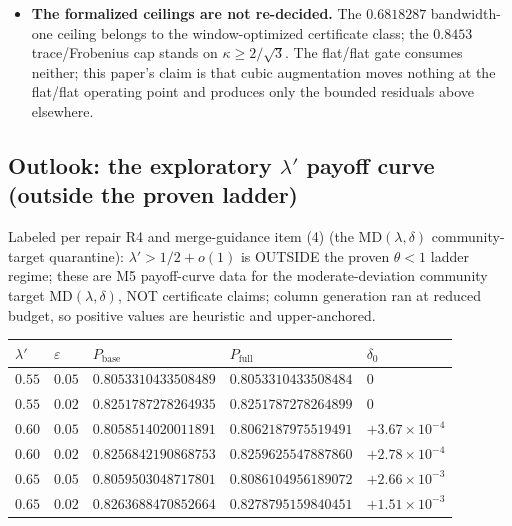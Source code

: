 \documentclass[11pt]{article}
\theoremstyle{plain}
\theoremstyle{definition}
\theoremstyle{remark}
\begin{document}
\begin{itemize}
  mean the constant-chasing is genuinely hard. (O4) The certified capacity
  constants are at $N = 64$; the mechanical $N = 128$ re-run (2026-08-27)
  reproduces every identity and inequality with $\le {\sim}2.5\%$ drift in the
  headline certified constants (deep-tail table values, $y \ge 1.5$, drift up to
  ${\sim}8\%$), moves Theorem~A(ii)'s deep threshold to $d \ge 1.1$, and shows the
  near-endpoint ledger failure at $N = 128$ as well (smaller sliver, better capped
  constant $0.9633$). (O5) All pair-channel constants are for the flat
  $\lambda = 1$ window; none transfer to the MT-cosine window without
  recomputation --- consistent with that window's residual row above.
\item \textbf{The formalized ceilings are not re-decided.} The $0.6818287$
  bandwidth-one ceiling belongs to the window-optimized certificate class; the
  $0.8453$ trace/Frobenius cap stands on $\kappa \ge 2/\sqrt{3}$. The flat/flat
  gate consumes neither; this paper's claim is that cubic augmentation moves
  nothing at the flat/flat operating point and produces only the bounded residuals
  above elsewhere.
\end{itemize}

\subsection[Outlook: the exploratory lambda' payoff curve (outside the proven
ladder)]{Outlook: the exploratory $\lambda'$ payoff curve (outside the proven
ladder)}
\label{sec:payoff}

Labeled per repair R4 and merge-guidance item (4) (the
$\mathrm{MD}(\lambda, \delta)$ community-target quarantine):
$\lambda' > 1/2 + o(1)$ is OUTSIDE the proven $\theta < 1$ ladder regime; these
are M5 payoff-curve data for the moderate-deviation community target
$\mathrm{MD}(\lambda, \delta)$, NOT certificate claims; column generation ran at
reduced budget, so positive values are heuristic and upper-anchored.

\begin{table}[h]
\centering
\begin{tabular}{@{}lllll@{}}
\toprule
$\lambda'$ & $\varepsilon$ & $P_{\mathrm{base}}$ & $P_{\mathrm{full}}$ &
$\delta_0$ \\
\midrule
$0.55$ & $0.05$ & $0.8053310433508489$ & $0.8053310433508484$ & $0$ \\
$0.55$ & $0.02$ & $0.8251787278264935$ & $0.8251787278264899$ & $0$ \\
$0.60$ & $0.05$ & $0.8058514020011891$ & $0.8062187975519491$ &
$+3.67 \times 10^{-4}$ \\
$0.60$ & $0.02$ & $0.8256842190868753$ & $0.8259625547887860$ &
$+2.78 \times 10^{-4}$ \\
$0.65$ & $0.05$ & $0.8059503048717801$ & $0.8086104956189072$ &
$+2.66 \times 10^{-3}$ \\
$0.65$ & $0.02$ & $0.8263688470852664$ & $0.8278795159840451$ &
$+1.51 \times 10^{-3}$ \\
\bottomrule
\end{tabular}
\end{table}
\end{document}
